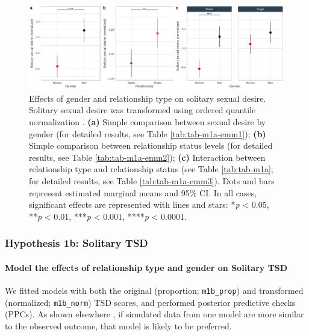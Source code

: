 \documentclass[
  bookmarksnumbered]{article}
\begin{document}
\begin{figure}
\centering
\includegraphics{Sexual_Desire_Arousal_V2_files/figure-latex/fig-h1a-1.pdf}
\caption{\label{fig:fig-h1a}Effects of gender and relationship type on solitary sexual desire. Solitary sexual desire was transformed using ordered quantile normalization \autocite{petersonOrderedQuantileNormalization2020a}. \textbf{(a)} Simple comparison between sexual desire by gender (for detailed results, see Table \ref{tab:tab-m1a-emm1}); \textbf{(b)} Simple comparison between relationship status levels (for detailed results, see Table \ref{tab:tab-m1a-emm2}); \textbf{(c)} Interaction between relationship type and relationship status (see Table \ref{tab:tab-m1a}; for detailed results, see Table \ref{tab:tab-m1a-emm3}). Dots and bars represent estimated marginal means and 95\% CI. In all cases, significant effects are represented with lines and stars: *\emph{p} \textless{} 0.05, **\emph{p} \textless{} 0.01, ***\emph{p} \textless{} 0.001, ****\emph{p} \textless{} 0.0001.}
\end{figure}

\subsubsection{Hypothesis 1b: Solitary TSD}\label{hypothesis1b}

\paragraph{Model the effects of relationship type and gender on Solitary TSD}\label{model-the-effects-of-relationship-type-and-gender-on-solitary-tsd-1}

We fitted models with both the original (proportion; \texttt{m1b\_prop}) and transformed (normalized; \texttt{m1b\_norm}) TSD scores, and performed posterior predictive checks (PPCs). As shown elsewhere \autocite[e.g.,][]{gabryVisualizationBayesianWorkflow2019}, if simulated data from one model are more similar to the observed outcome, that model is likely to be preferred.
\end{document}
